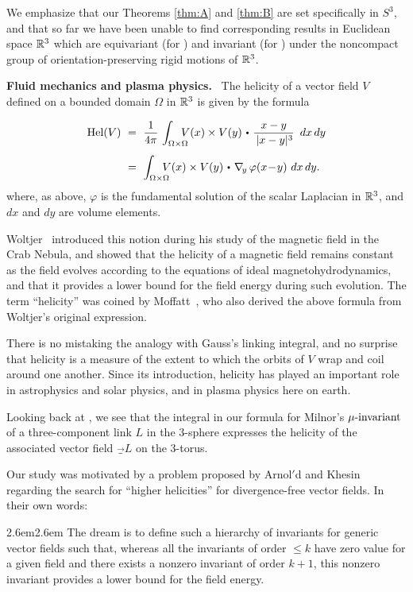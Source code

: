 {We emphasize that our Theorems \ref{thm:A} and \ref{thm:B} are set specifically in $S^3$, and that so far we have been unable to find corresponding results in Euclidean space $\mathbb R^3$ which are equivariant (for ) and invariant (for ) under the noncompact group of orientation-preserving rigid motions of $\mathbb R^3$.   


{\bf Fluid mechanics and plasma physics.} \ The {\itb helicity} of a vector field $V$ defined on a bounded domain $\Omega$ in $\mathbb R^3$ is given by the formula
$$
\begin{aligned}
\text{Hel}(V) \ &= \ \frac{1}{4\pi}\, \int_{\Omega\times\Omega} \!\!\!\!\!V(x) \times V(y) \dtw \frac{x-y}{\,|x-y|^3} \  \,dx \, dy \\
 \ &= \ \int_{\Omega\times\Omega} \!\!\!\!\!V(x) \times V(y) \dtw \nabla_{\!y}\,\varphi(x\!-\!y) \ dx \, dy.
\end{aligned}
$$
where, as above, $\varphi$ is the fundamental solution of the scalar Laplacian in $\mathbb R^3$, and $dx$ and $dy$ are volume elements.

Woltjer~\cite{Woltjer} introduced this notion during his study of the magnetic field in the Crab Nebula, and showed that the helicity of a magnetic field remains constant as the field evolves according to the equations of ideal magnetohydrodynamics, and that it provides a lower bound for the field energy during such evolution.  The term ``helicity'' was coined by Moffatt~\cite{Moffatt}, who also derived the above formula from Woltjer's original expression.  

There is no mistaking the analogy with Gauss's linking integral, and no surprise that helicity is a measure of the extent to which the orbits of $V$ wrap and coil around one another.  Since its introduction, helicity has played an important role in astrophysics and solar physics, and in plasma physics here on earth.  

Looking back at , we see that the integral in our formula for Milnor's $\mu\textup{-invariant}$ of a three-component link $L$ in the 3-sphere expresses the helicity of the associated vector field $\vec_L$ on the 3-torus.


Our study was motivated by a problem proposed by Arnol$'$d and Khesin~\cite{ArnoldKhesin98} regarding the search for ``higher helicities'' for divergence-free vector fields.  In their own words:

\vspace{.05in}
\begin{indentation}{2.6em}{2.6em}
\small\itb
\noindent The dream is to define such a hierarchy of invariants for generic vector fields such that, whereas all the invariants of order $\leq k$ have zero value for a given field and there exists a nonzero invariant of order $k+1$, this nonzero invariant provides a lower bound for the field energy.
\end{indentation}
\vspace{.05in}

}
